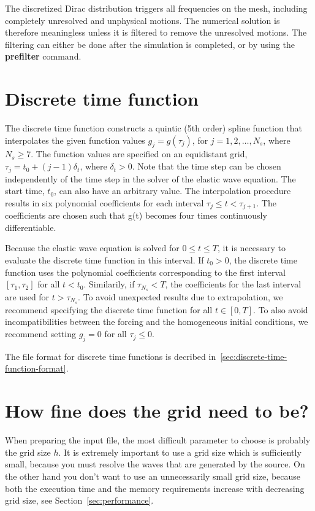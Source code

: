 \documentclass[11pt]{report}
\begin{document}
The discretized Dirac distribution triggers all frequencies on the mesh, including completely
unresolved and unphysical motions. The numerical solution is therefore meaningless unless it is
filtered to remove the unresolved motions. The filtering can either be done after the simulation is
completed, or by using the {\bf prefilter} command.

\section{Discrete time function}

The discrete time function constructs a quintic (5th order) spline function that interpolates the
given function values $g_j = g(\tau_j)$, for $j=1,2,\ldots, N_s$, where $N_s\geq 7$. The function
values are specified on an equidistant grid, $\tau_j = t_0 + (j-1) \delta_t$, where
$\delta_t>0$. Note that the time step can be chosen independently of the time step in the solver of
the elastic wave equation. The start time, $t_0$, can also have an arbitrary value. The
interpolation procedure results in six polynomial coefficients for each interval $\tau_j\leq t
<\tau_{j+1}$. The coefficients are chosen such that g(t) becomes four times continuously
differentiable.

Because the elastic wave equation is solved for $0\leq t\leq T$, it is necessary to evaluate the
discrete time function in this interval. If $t_0>0$, the discrete time function uses the polynomial
coefficients corresponding to the first interval $[\tau_1,\tau_2]$ for all $t<t_0$. Similarily,
if $\tau_{N_s}<T$, the coefficients for the last interval are used for $t>\tau_{N_s}$. To avoid
unexpected results due to extrapolation, we recommend specifying the discrete time function for all
$t\in[0,T]$. To also avoid incompatibilities between the forcing and the homogeneous initial conditions,
we recommend setting $g_j=0$ for all $\tau_j\leq 0$.

The file format for discrete time functions is decribed in~\ref{sec:discrete-time-function-format}.

\section{How fine does the grid need to be?}\label{sec:grid-size}

When preparing the input file, the most difficult parameter to choose is probably the grid size
$h$. It is extremely important to use a grid size which is sufficiently small, because you must resolve
the waves that are generated by the source. On the other hand you don't want to use an
unnecessarily small grid size, because both the execution time and the memory requirements
increase with decreasing grid size, see Section~\ref{sec:performance}.
\end{document}
